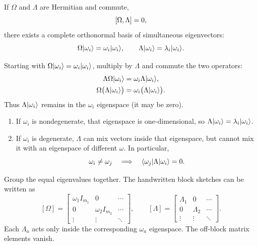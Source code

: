 If $\Omega$ and $\Lambda$ are Hermitian and commute,
\[
 \left[\Omega,\Lambda\right]=0,
\]
there exists a complete orthonormal basis of simultaneous eigenvectors:
\[
 \Omega\lvert \omega_i\rangle=\omega_i\lvert \omega_i\rangle,\qquad
 \Lambda\lvert \omega_i\rangle=\lambda_i\lvert \omega_i\rangle.
\]

Starting with $\Omega\lvert \omega_i\rangle=\omega_i\lvert \omega_i\rangle$, multiply
by $\Lambda$ and commute the two operators:
\begin{align*}
 \Lambda\Omega\lvert \omega_i\rangle&=\omega_i\Lambda\lvert \omega_i\rangle,\\
 \Omega\bigl(\Lambda\lvert \omega_i\rangle\bigr)
 &=\omega_i\bigl(\Lambda\lvert \omega_i\rangle\bigr).
\end{align*}
Thus $\Lambda\lvert \omega_i\rangle$ remains in the $\omega_i$ eigenspace
(it may be zero).
\begin{enumerate}[label=(\roman*)]
\item If $\omega_i$ is nondegenerate, that eigenspace is
one-dimensional, so $\Lambda\lvert \omega_i\rangle=\lambda_i\lvert \omega_i\rangle$.
\item If $\omega_i$ is degenerate, $\Lambda$ can mix vectors inside
that eigenspace, but cannot mix it with an eigenspace of different
$\omega$. In particular,
\[
 \omega_i\ne\omega_j\quad\Longrightarrow\quad
 \langle \omega_j\rvert \Lambda\lvert \omega_i\rangle=0.
\]
\end{enumerate}

Group the equal eigenvalues together. The handwritten block sketches
can be written as
\[
 [\Omega]=\begin{bmatrix}
 \omega_1 I_{m_1}&0&\cdots\\
 0&\omega_2 I_{m_2}&\cdots\\
 \vdots&\vdots&\ddots
 \end{bmatrix},\qquad
 [\Lambda]=\begin{bmatrix}
 \Lambda_1&0&\cdots\\
 0&\Lambda_2&\cdots\\
 \vdots&\vdots&\ddots
 \end{bmatrix}.
\]
Each $\Lambda_a$ acts only inside the corresponding
$\omega_a$ eigenspace. The off-block matrix elements vanish.

